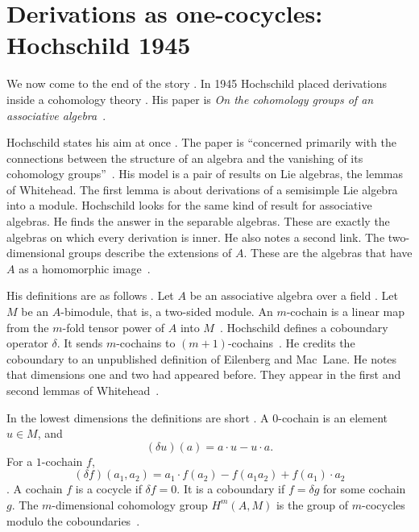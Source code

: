 \section[Derivations as one-cocycles: Hochschild 1945][Derivations as one-cocycles]{Derivations as one-cocycles: Hochschild 1945}\label{sec:origins:cohomology}

We now come to the end of the story \cite{Hochschild1945}. In 1945 Hochschild
placed derivations inside a cohomology theory \cite{Hochschild1945}. His paper
is \emph{On the cohomology groups of an associative
algebra}~\cite{Hochschild1945}.

Hochschild states his aim at once \cite[p.~58]{Hochschild1945}. The paper is
``concerned primarily with the connections between the structure of an algebra
and the vanishing of its cohomology groups''~\cite[p.~58]{Hochschild1945}. His
model is a pair of results on Lie algebras, the lemmas of Whitehead. The first
lemma is about derivations of a semisimple Lie algebra into a module.
Hochschild looks for the same kind of result for associative algebras. He
finds the answer in the separable algebras. These are exactly the algebras on
which every derivation is inner. He also notes a second link. The
two-dimensional groups describe the extensions of $A$. These are the algebras
that have $A$ as a homomorphic image~\cite[p.~58]{Hochschild1945}.

His definitions are as follows \cite[\S 1, p.~59]{Hochschild1945}. Let $A$ be
an associative algebra over a field \cite[\S 1, p.~59]{Hochschild1945}. Let
$M$ be an $A$-bimodule, that is, a two-sided module. An $m$-cochain is a
linear map from the $m$-fold tensor power of $A$ into $M$~\cite[\S 1,
p.~59]{Hochschild1945}. Hochschild defines a coboundary operator $\delta$. It
sends $m$-cochains to $(m+1)$-cochains~\cite[\S 2, Definition~2.1,
p.~59]{Hochschild1945}. He credits the coboundary to an unpublished definition
of Eilenberg and Mac~Lane. He notes that dimensions one and two had appeared
before. They appear in the first and second lemmas of
Whitehead~\cite[p.~58]{Hochschild1945}.

In the lowest dimensions the definitions are short \cite[p.~60, Definitions~2.2, 2.3]{Hochschild1945}. A $0$-cochain is an
element $u \in M$, and
\[
(\delta u)(a) = a\cdot u - u\cdot a .
\]
For a $1$-cochain $f$,
\[
(\delta f)(a_1, a_2) = a_1 \cdot f(a_2) - f(a_1 a_2) + f(a_1)\cdot a_2
\]
\cite[p.~60]{Hochschild1945}. A cochain $f$ is a cocycle if $\delta f = 0$.
It is a coboundary if $f = \delta g$ for some cochain $g$. The
$m$-dimensional cohomology group $H^m(A,M)$ is the group of $m$-cocycles
modulo the coboundaries~\cite[p.~60, Definitions~2.2, 2.3]{Hochschild1945}.

